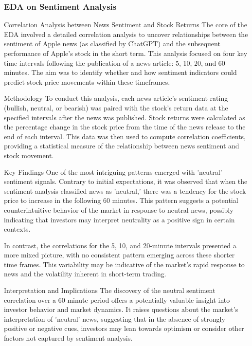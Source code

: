 \subsubsection{EDA on Sentiment Analysis}
Correlation Analysis between News Sentiment and Stock Returns
The core of the EDA involved a detailed correlation analysis to uncover relationships between the sentiment of Apple news (as classified by ChatGPT) and the subsequent performance of Apple's stock in the short term. This analysis focused on four key time intervals following the publication of a news article: 5, 10, 20, and 60 minutes. The aim was to identify whether and how sentiment indicators could predict stock price movements within these timeframes.

Methodology
To conduct this analysis, each news article's sentiment rating (bullish, neutral, or bearish) was paired with the stock's return data at the specified intervals after the news was published. Stock returns were calculated as the percentage change in the stock price from the time of the news release to the end of each interval. This data was then used to compute correlation coefficients, providing a statistical measure of the relationship between news sentiment and stock movement.

Key Findings
One of the most intriguing patterns emerged with 'neutral' sentiment signals. Contrary to initial expectations, it was observed that when the sentiment analysis classified news as 'neutral,' there was a tendency for the stock price to increase in the following 60 minutes. This pattern suggests a potential counterintuitive behavior of the market in response to neutral news, possibly indicating that investors may interpret neutrality as a positive sign in certain contexts.

In contrast, the correlations for the 5, 10, and 20-minute intervals presented a more mixed picture, with no consistent pattern emerging across these shorter time frames. This variability may be indicative of the market's rapid response to news and the volatility inherent in short-term trading.

Interpretation and Implications
The discovery of the neutral sentiment correlation over a 60-minute period offers a potentially valuable insight into investor behavior and market dynamics. It raises questions about the market's interpretation of 'neutral' news, suggesting that in the absence of strongly positive or negative cues, investors may lean towards optimism or consider other factors not captured by sentiment analysis.

